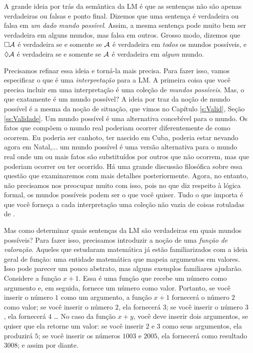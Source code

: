 A grande ideia por trás da semântica da LM é que as sentenças não são apenas verdadeiras ou falsas e ponto final.  Dizemos que uma  sentença é verdadeira ou falsa em \emph{um dado mundo possível}. Assim,  a mesma sentença pode muito bem ser verdadeira em alguns mundos,  mas falsa em outros. Grosso modo, dizemos que $\Box \mathcal{A}$ é verdadeira   se e somente se $\mathcal{A}$ é verdadeira em \emph{todos} os mundos possíveis, e $\Diamond\mathcal{A}$ é verdadeira se e somente se  $\mathcal{A}$ é verdadeira em \emph{algum} mundo.

Precisamos refinar essa ideia e torná-la mais precisa. Para fazer isso,  vamos especificar o que é uma  \emph{interpretação} para a LM. A primeira coisa que você precisa incluir em uma interpretação é uma coleção de \emph{mundos possíveis}. 
Mas, o que exatamente é um mundo possível? A ideia por traz da noção de mundo possível é a mesma da noção de situação, que vimos no Capítulo \ref{s:Valid}, Seção \ref{ss:Validade}. Um mundo possível é uma alternativa concebível para o mundo. Os fatos que compõem o mundo real poderiam ocorrer diferentemente de como ocorrem. Eu poderia ser canhoto, ter nascido em Cuba, poderia estar nevando agora em Natal,... um mundo possível é uma versão alternativa para o mundo real onde um ou mais fatos são substituídos por outros que não ocorrem, mas que poderiam ocorrer ou ter ocorrido. 
Há uma grande discussão filosófica sobre  essa questão que examinaremos com mais detalhes posteriormente. Agora, no entanto,  não precisamos nos preocupar muito com isso, pois no que diz respeito à lógica formal, os mundos possíveis podem ser o que você quiser. Tudo o que importa é que você forneça a cada interpretação uma coleção não vazia de coisas rotuladas  de  .


Mas como determinar quais sentenças da LM são verdadeiras em quais mundos possíveis? Para fazer isso, precisamos introduzir a noção de uma \emph{função de valoração}. Aqueles que estudaram matemática já estão familiarizados com a ideia geral de função: uma entidade matemática que mapeia argumentos em valores. Isso pode parecer um pouco abstrato, mas alguns exemplos familiares ajudarão. Considere a função $x + 1$. Essa é uma função que recebe um número como argumento e, em seguida, fornece um número como valor. Portanto, se você inserir o número $1$ como um argumento, a função $x + 1$ fornecerá o número $2$ como valor; se você inserir o número  $2$, ela fornecerá $3$; se você inserir o número  $3$, ela fornecerá $4$ \dots{}  No caso da função $x + y$, você deve inserir dois argumentos, se quiser que ela retorne um valor: se você inserir $2$ e $3$ como seus argumentos, ela produzirá $5$; se você inserir os números  $1003$ e $2005$, ela fornecerá como resultado $3008$; e assim por diante.

